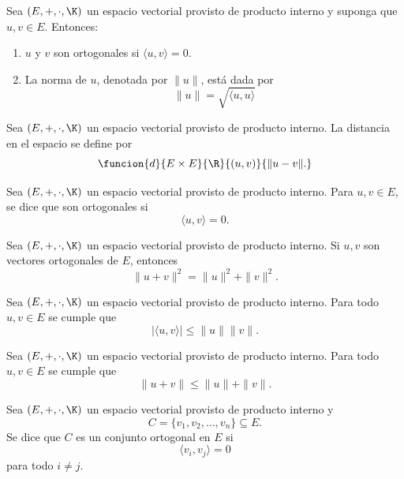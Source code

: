 \documentclass[a4,11pt]{aleph-notas}
\begin{document}
\begin{defi}
Sea $(E,+,\cdot,\K)$ un espacio vectorial provisto de producto interno y suponga que $u, v \in E$.
Entonces:
\begin{enumerate}
    \item $u$ y $v$ son ortogonales si $\langle u, v \rangle = 0$.
    \item La norma de $u$, denotada por $\|u \|$, está dada por
    \[
        \| u\| = \sqrt{\langle u, u \rangle}
    \]
\end{enumerate}
\end{defi}

\begin{defi}
    Sea $(E,+,\cdot,\K)$ un espacio vectorial provisto de producto interno. La distancia en el espacio se define por
    \[
        \funcion{d}{E\times E}{\R}{(u,v)}{\| u - v\|.}
    \]
\end{defi}


\begin{teo}
    Sea $(E,+,\cdot,\K)$ un espacio vectorial provisto de producto interno. Para  $u,v\in E$, se dice que son ortogonales si
    \[
        \langle u , v \rangle = 0.
    \]
\end{teo}


\begin{teo}
    Sea $(E,+,\cdot,\K)$ un espacio vectorial provisto de producto interno.
    Si $u,v$ son vectores ortogonales de $E$, entonces
    \[
        \| u + v \|^2 = \|u\|^2 + \|v\|^2.
    \]
\end{teo}

\begin{teo}
    Sea $(E,+,\cdot,\K)$ un espacio vectorial provisto de producto interno.
    Para todo $u,v\in E$ se cumple que
    \[
        | \langle u , v \rangle | \leq \|u\|  \|v\|.
    \]
\end{teo}

\begin{teo}
    Sea $(E,+,\cdot,\K)$ un espacio vectorial provisto de producto interno.
    Para todo $u,v\in E$ se cumple que
    \[
        \| u + v \| \leq \|u\| + \|v\|.
    \]
\end{teo}


\begin{defi}
    Sea $(E,+,\cdot,\K)$ un espacio vectorial provisto de producto interno y
    \[C=\{v_1, v_2, \ldots, v_n\}\subseteq E.\] Se dice que $C$ es un conjunto ortogonal en $E$ si
    \[
        \langle v_i, v_j \rangle = 0
    \]
    para todo $i \neq j$.
\end{defi}
\end{document}
